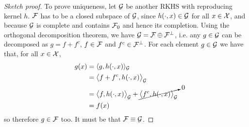 \begin{proof}[Sketch proof]
  To prove uniqueness, let ${\mathcal G}$ be another RKHS with reproducing kernel $h$.
  ${\mathcal F}$ has to be a closed subspace of ${\mathcal G}$, since $h(\cdot,x) \in {\mathcal G}$ for all $x\in{\mathcal X}$, and because ${\mathcal G}$ is complete and contains ${\mathcal F}_0$ and hence its completion.
  Using the orthogonal decomposition theorem, we have ${\mathcal G} = {\mathcal F} \oplus {\mathcal F}^\bot$, i.e. any $g\in{\mathcal G}$ can be decomposed as $g = f + f^c$, $f\in{\mathcal F}$ and $f^c\in{\mathcal F}^\bot$.
  For each element $g\in{\mathcal G}$ we have that, for all $x\in{\mathcal X}$,
  \begin{align*}
    g(x) &= \langle g,h(\cdot,x)\rangle_{\mathcal G} \\
    &= \big\langle f+f^c, h(\cdot,x) \big\rangle_{\mathcal G} \\
    &= \big\langle f, h(\cdot,x) \big\rangle_{\mathcal G} + \cancelto{0}{\big\langle f^c, h(\cdot,x) \big\rangle_{\mathcal G}} \\
    &= f(x)
  \end{align*}
  so therefore $g\in{\mathcal F}$ too.
  It must be that ${\mathcal F}\equiv{\mathcal G}$.
%  
%  


\end{proof}
